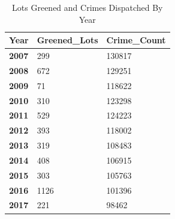 \documentclass{article}
\begin{document}
\begin{table}[]
\begin{center}
\caption{\label{tab:ab}Lots Greened and Crimes Dispatched By Year}
\begin{tabular}{lll}
\hline
\textbf{Year} & \textbf{Greened\_Lots} & \textbf{Crime\_Count} \\ \hline
\textbf{2007} & 299                    & 130817                \\
\textbf{2008} & 672                    & 129251                \\
\textbf{2009} & 71                     & 118622                \\
\textbf{2010} & 310                    & 123298                \\
\textbf{2011} & 529                    & 124223                \\
\textbf{2012} & 393                    & 118002                \\
\textbf{2013} & 319                    & 108483                \\
\textbf{2014} & 408                    & 106915                \\
\textbf{2015} & 303                    & 105763                \\
\textbf{2016} & 1126                   & 101396                \\
\textbf{2017} & 221                    & 98462        
\end{tabular}
\end{center}
\end{table}
\end{document}
